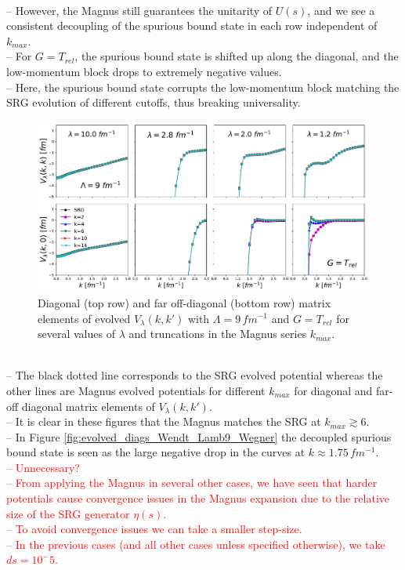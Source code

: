 \documentclass[preprintnumbers,floatfix,aps,prc,preprint,nofootinbib]{revtex4-1}
\begin{document}
\\
-- However, the Magnus still guarantees the unitarity of $U(s)$, and we see a consistent decoupling of the spurious bound state in each row independent of $k_{max}$.
\\
-- For $G=T_{rel}$, the spurious bound state is shifted up along the diagonal, and the low-momentum block drops to extremely negative values.
\\
-- Here, the spurious bound state corrupts the low-momentum block matching the SRG evolution of different cutoffs, thus breaking universality.
\\
%
\begin{figure}
	\captionsetup{singlelinecheck=false,justification=raggedright}
	\centering
	\includegraphics[width=14cm]{evolved_diags_Wendt_Lamb9_T}
	\hspace*{0.05\textwidth}
	\caption{Diagonal (top row) and far off-diagonal (bottom row) matrix elements of evolved $V_{\lambda}(k,k')$ with $\Lambda=9 \, fm^{-1}$ and $G=T_{rel}$ for several values of $\lambda$ and truncations in the Magnus series $k_{max}$.}
	\label{fig:evolved_diags_Wendt_Lamb9_T}
\end{figure}
%
\\
-- The black dotted line corresponds to the SRG evolved potential whereas the other lines are Magnus evolved potentials for different $k_{max}$ for diagonal and far-off diagonal matrix elements of $V_{\lambda}(k,k')$.
\\
-- It is clear in these figures that the Magnus matches the SRG at $k_{max} \gtrsim 6$.
\\
-- In Figure \ref{fig:evolved_diags_Wendt_Lamb9_Wegner} the decoupled spurious bound state is seen as the large negative drop in the curves at $k \approx 1.75 \, fm^{-1}$.
\\
\textcolor{red}{%
-- Unnecessary?
\\
-- From applying the Magnus in several other cases, we have seen that harder potentials cause convergence issues in the Magnus expansion due to the relative size of the SRG generator $\eta(s)$.
\\
-- To avoid convergence issues we can take a smaller step-size.
\\
-- In the previous cases (and all other cases unless specified otherwise), we take $ds=10^-5$.
}
\\
\end{document}
